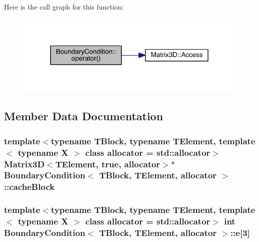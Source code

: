 Here is the call graph for this function\+:\nopagebreak
\begin{figure}[H]
\begin{center}
\leavevmode
\includegraphics[width=316pt]{db/d64/class_boundary_condition_aadcfe05da7761b68191835b09d4d2cf0_cgraph}
\end{center}
\end{figure}




\subsection{Member Data Documentation}
\hypertarget{class_boundary_condition_a1e0c33fa794a6d333d4451f8fde04c29}{}
\subsubsection[{cache\+Block}]{\setlength{\rightskip}{0pt plus 5cm}template$<$typename T\+Block, typename T\+Element, template$<$ typename X $>$ class allocator = std\+::allocator$>$ {\bf Matrix3\+D}$<$T\+Element, true, allocator$>$$\ast$ {\bf Boundary\+Condition}$<$ T\+Block, T\+Element, allocator $>$\+::cache\+Block\hspace{0.3cm}{\ttfamily [protected]}}\label{class_boundary_condition_a1e0c33fa794a6d333d4451f8fde04c29}
\hypertarget{class_boundary_condition_a755da05bbc5a09adb17a6f1e5a15f25b}{}
\subsubsection[{e}]{\setlength{\rightskip}{0pt plus 5cm}template$<$typename T\+Block, typename T\+Element, template$<$ typename X $>$ class allocator = std\+::allocator$>$ int {\bf Boundary\+Condition}$<$ T\+Block, T\+Element, allocator $>$\+::e\mbox{[}3\mbox{]}\hspace{0.3cm}{\ttfamily [protected]}}\label{class_boundary_condition_a755da05bbc5a09adb17a6f1e5a15f25b}
\hypertarget{class_boundary_condition_a7734cfc6ee1ce3a1dea426ab289a299a}{}
